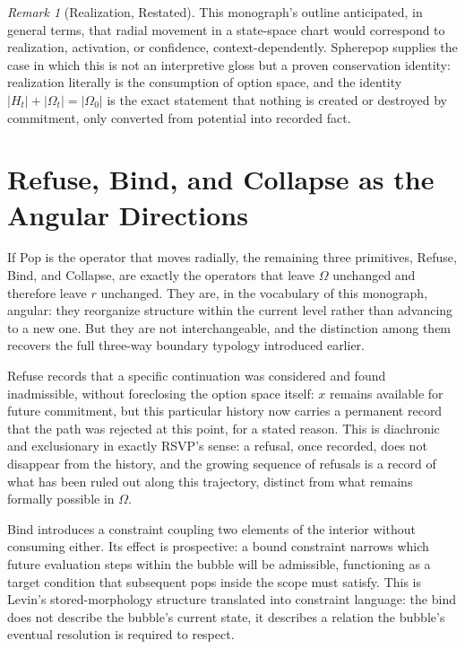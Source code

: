 \documentclass[11pt,fleqn]{book}
\numberwithin{equation}{chapter}
\theoremstyle{plain}
\theoremstyle{definition}
\theoremstyle{remark}
\newtheorem{remark}[theorem]{Remark}
\begin{document}
\begin{remark}[Realization, Restated]
This monograph's outline anticipated, in general terms, that radial movement in a state-space chart would correspond to realization, activation, or confidence, context-dependently. Spherepop supplies the case in which this is not an interpretive gloss but a proven conservation identity: realization literally is the consumption of option space, and the identity \(|H_t|+|\Omega_t|=|\Omega_0|\) is the exact statement that nothing is created or destroyed by commitment, only converted from potential into recorded fact.
\end{remark}

\section{Refuse, Bind, and Collapse as the Angular Directions}

If Pop is the operator that moves radially, the remaining three primitives, Refuse, Bind, and Collapse, are exactly the operators that leave \(\Omega\) unchanged and therefore leave \(r\) unchanged. They are, in the vocabulary of this monograph, angular: they reorganize structure within the current level rather than advancing to a new one. But they are not interchangeable, and the distinction among them recovers the full three-way boundary typology introduced earlier.

Refuse records that a specific continuation was considered and found inadmissible, without foreclosing the option space itself: \(x\) remains available for future commitment, but this particular history now carries a permanent record that the path was rejected at this point, for a stated reason. This is diachronic and exclusionary in exactly RSVP's sense: a refusal, once recorded, does not disappear from the history, and the growing sequence of refusals is a record of what has been ruled out along this trajectory, distinct from what remains formally possible in \(\Omega\).

Bind introduces a constraint coupling two elements of the interior without consuming either. Its effect is prospective: a bound constraint narrows which future evaluation steps within the bubble will be admissible, functioning as a target condition that subsequent pops inside the scope must satisfy. This is Levin's stored-morphology structure translated into constraint language: the bind does not describe the bubble's current state, it describes a relation the bubble's eventual resolution is required to respect.
\end{document}
